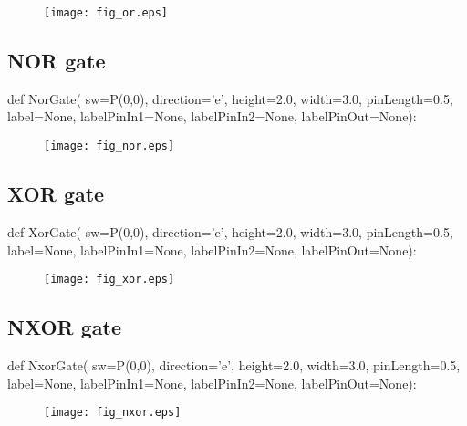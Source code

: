 \begin{figure}[!h]
\centerline{\texttt{[image: fig\_or.eps]}}
\end{figure}

\subsection{NOR gate}
\label{func:electronicsNor}
\begin{python}
def NorGate(
        sw=P(0,0),
        direction='e',
        height=2.0,
        width=3.0,
        pinLength=0.5,
        label=None,
        labelPinIn1=None,
        labelPinIn2=None,
        labelPinOut=None):
\end{python}

\begin{figure}[!h]
\centerline{\texttt{[image: fig\_nor.eps]}}
\end{figure}

\subsection{XOR gate}
\label{func:electronicsXor}
\begin{python}
def XorGate(
        sw=P(0,0),
        direction='e',
        height=2.0,
        width=3.0,
        pinLength=0.5,
        label=None,
        labelPinIn1=None,
        labelPinIn2=None,
        labelPinOut=None):
\end{python}

\begin{figure}[!h]
\centerline{\texttt{[image: fig\_xor.eps]}}
\end{figure}

\subsection{NXOR gate}
\label{func:electronicsNxor}
\begin{python}
def NxorGate(
        sw=P(0,0),
        direction='e',
        height=2.0,
        width=3.0,
        pinLength=0.5,
        label=None,
        labelPinIn1=None,
        labelPinIn2=None,
        labelPinOut=None):
\end{python}

\begin{figure}[!h]
\centerline{\texttt{[image: fig\_nxor.eps]}}
\end{figure}

